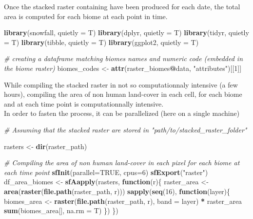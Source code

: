 \documentclass[]{article}
\newenvironment{Shaded}{\begin{snugshade}}{\end{snugshade}}
\newcommand{\KeywordTok}[1]{\textcolor[rgb]{0.13,0.29,0.53}{\textbf{#1}}}
\newcommand{\DataTypeTok}[1]{\textcolor[rgb]{0.13,0.29,0.53}{#1}}
\newcommand{\DecValTok}[1]{\textcolor[rgb]{0.00,0.00,0.81}{#1}}
\newcommand{\StringTok}[1]{\textcolor[rgb]{0.31,0.60,0.02}{#1}}
\newcommand{\CommentTok}[1]{\textcolor[rgb]{0.56,0.35,0.01}{\textit{#1}}}
\newcommand{\OtherTok}[1]{\textcolor[rgb]{0.56,0.35,0.01}{#1}}
\newcommand{\ControlFlowTok}[1]{\textcolor[rgb]{0.13,0.29,0.53}{\textbf{#1}}}
\newcommand{\OperatorTok}[1]{\textcolor[rgb]{0.81,0.36,0.00}{\textbf{#1}}}
\newcommand{\NormalTok}[1]{#1}
\begin{document}
Once the stacked raster containing have been produced for each date, the
total area is computed for each biome at each point in time.

\begin{Shaded}
\begin{Highlighting}[]
\KeywordTok{library}\NormalTok{(snowfall, }\DataTypeTok{quietly =}\NormalTok{ T)}
\KeywordTok{library}\NormalTok{(dplyr, }\DataTypeTok{quietly =}\NormalTok{ T)}
\KeywordTok{library}\NormalTok{(tidyr, }\DataTypeTok{quietly =}\NormalTok{ T)}
\KeywordTok{library}\NormalTok{(tibble, }\DataTypeTok{quietly =}\NormalTok{ T)}
\KeywordTok{library}\NormalTok{(ggplot2, }\DataTypeTok{quietly =}\NormalTok{ T)}

\CommentTok{# creating a dataframe matching biomes names and numeric code (embedded in the biome raster)}
\NormalTok{biomes_codes <-}\StringTok{ }\KeywordTok{attr}\NormalTok{(raster_biomes}\OperatorTok{@}\NormalTok{data, }\StringTok{"attributes"}\NormalTok{)[[}\DecValTok{1}\NormalTok{]] }
\end{Highlighting}
\end{Shaded}

While compiling the stacked raster in not so computationnaly intensive
(a few hours), compiling the area of non human land-cover in each cell,
for each biome and at each time point is computationnally intensive.\\
In order to fasten the process, it can be parallelized (here on a single
machine)

\begin{Shaded}
\begin{Highlighting}[]
\CommentTok{# Assuming that the stacked raster are stored in "path/to/stacked_raster_folder"}

\NormalTok{rasters <-}\StringTok{ }\KeywordTok{dir}\NormalTok{(raster_path)}

\CommentTok{# Compiling the area of non human land-cover in each pixel for each biome at each time point}
\KeywordTok{sfInit}\NormalTok{(}\DataTypeTok{parallel=}\OtherTok{TRUE}\NormalTok{, }\DataTypeTok{cpus=}\DecValTok{6}\NormalTok{)}
\KeywordTok{sfExport}\NormalTok{(}\StringTok{"raster"}\NormalTok{)}
\NormalTok{df_area_biomes <-}\StringTok{ }\KeywordTok{sfAapply}\NormalTok{(rasters, }\ControlFlowTok{function}\NormalTok{(r)\{}
\NormalTok{                    raster_area <-}\StringTok{ }\KeywordTok{area}\NormalTok{(}\KeywordTok{raster}\NormalTok{(}\KeywordTok{file.path}\NormalTok{(raster_path, r)))}
                    \KeywordTok{sapply}\NormalTok{(}\KeywordTok{seq}\NormalTok{(}\DecValTok{16}\NormalTok{), }\ControlFlowTok{function}\NormalTok{(layer)\{}
\NormalTok{                        biomes_area <-}\StringTok{ }\KeywordTok{raster}\NormalTok{(}\KeywordTok{file.path}\NormalTok{(raster_path, r), }\DataTypeTok{band =}\NormalTok{ layer) }\OperatorTok{*}\StringTok{ }\NormalTok{raster_area}
                        \KeywordTok{sum}\NormalTok{(biomes_area[], }\DataTypeTok{na.rm =}\NormalTok{ T)}
\NormalTok{                        \})}
\NormalTok{                    \})}
\end{Highlighting}
\end{Shaded}
\end{document}
